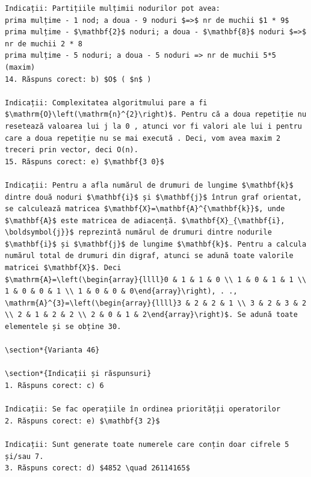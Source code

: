 \documentclass[10pt]{article}
\begin{document}
\begin{verbatim}
Indicații: Partițiile mulțimii nodurilor pot avea:
prima mulțime - 1 nod; a doua - 9 noduri $=>$ nr de muchii $1 * 9$
prima mulțime - $\mathbf{2}$ noduri; a doua - $\mathbf{8}$ noduri $=>$ nr de muchii 2 * 8
prima mulțime - 5 noduri; a doua - 5 noduri => nr de muchii 5*5 (maxim)
14. Răspuns corect: b) $O$ ( $n$ )

Indicații: Complexitatea algoritmului pare a fi $\mathrm{O}\left(\mathrm{n}^{2}\right)$. Pentru că a doua repetiție nu resetează valoarea lui j la 0 , atunci vor fi valori ale lui i pentru care a doua repetiție nu se mai execută . Deci, vom avea maxim 2 treceri prin vector, deci O(n).
15. Răspuns corect: e) $\mathbf{3 0}$

Indicații: Pentru a afla numărul de drumuri de lungime $\mathbf{k}$ dintre două noduri $\mathbf{i}$ și $\mathbf{j}$ întrun graf orientat, se calculează matricea $\mathbf{X}=\mathbf{A}^{\mathbf{k}}$, unde $\mathbf{A}$ este matricea de adiacență. $\mathbf{X}_{\mathbf{i}, \boldsymbol{j}}$ reprezintă numărul de drumuri dintre nodurile $\mathbf{i}$ și $\mathbf{j}$ de lungime $\mathbf{k}$. Pentru a calcula numărul total de drumuri din digraf, atunci se adună toate valorile matricei $\mathbf{X}$. Deci
$\mathrm{A}=\left(\begin{array}{llll}0 & 1 & 1 & 0 \\ 1 & 0 & 1 & 1 \\ 1 & 0 & 0 & 1 \\ 1 & 0 & 0 & 0\end{array}\right), . ., \mathrm{A}^{3}=\left(\begin{array}{llll}3 & 2 & 2 & 1 \\ 3 & 2 & 3 & 2 \\ 2 & 1 & 2 & 2 \\ 2 & 0 & 1 & 2\end{array}\right)$. Se adună toate elementele și se obține 30.

\section*{Varianta 46}

\section*{Indicații și răspunsuri}
1. Răspuns corect: c) 6

Indicații: Se fac operațiile în ordinea priorităț̦ii operatorilor
2. Răspuns corect: e) $\mathbf{3 2}$

Indicații: Sunt generate toate numerele care conțin doar cifrele 5 și/sau 7.
3. Răspuns corect: d) $4852 \quad 26114165$


\end{verbatim}
\end{document}

